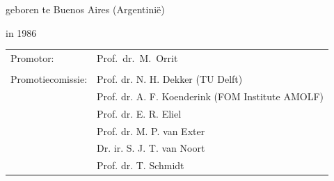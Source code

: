 \begin{titlepage}
\begin{center}
\bigskip
\bigskip

geboren te Buenos Aires (Argentinië)

in 1986

\vspace*{2\bigskipamount}

\end{center}

\clearpage
\thispagestyle{empty}


\medskip\noindent
\begin{tabular}{ll}
    Promotor: & Prof.\ dr.\ M.\ Orrit \\
    & \\
    Promotiecomissie: & Prof. dr. N. H. Dekker (TU Delft)\\
    &	Prof. dr. A. F. Koenderink (FOM Institute AMOLF)\\
    &	Prof. dr. E. R. Eliel \\
    &	Prof. dr. M. P. van Exter \\
    &   Dr. ir. S. J. T. van Noort \\
    &	Prof. dr. T. Schmidt
\end{tabular}


\medskip



\end{titlepage}
